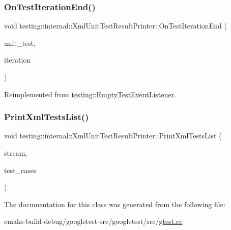 \mbox{\label{classtesting_1_1internal_1_1XmlUnitTestResultPrinter_a2ae986dd2f4f2aed31cc6f3bc8c56898}} 
\subsubsection{\texorpdfstring{OnTestIterationEnd()}{OnTestIterationEnd()}}
{\footnotesize\ttfamily void testing\+::internal\+::\+Xml\+Unit\+Test\+Result\+Printer\+::\+On\+Test\+Iteration\+End (\begin{DoxyParamCaption}\item[{const \mbox{\hyperlink{classtesting_1_1UnitTest}{Unit\+Test}} \&}]{unit\+\_\+test,  }\item[{int}]{iteration }\end{DoxyParamCaption})\hspace{0.3cm}{\ttfamily [virtual]}}



Reimplemented from \mbox{\hyperlink{classtesting_1_1EmptyTestEventListener_a2253e5a18b3cf7bccd349567a252209d}{testing\+::\+Empty\+Test\+Event\+Listener}}.

\mbox{\label{classtesting_1_1internal_1_1XmlUnitTestResultPrinter_aaefdb155fde088eea18310f23afd2daa}} 
\subsubsection{\texorpdfstring{PrintXmlTestsList()}{PrintXmlTestsList()}}
{\footnotesize\ttfamily void testing\+::internal\+::\+Xml\+Unit\+Test\+Result\+Printer\+::\+Print\+Xml\+Tests\+List (\begin{DoxyParamCaption}\item[{std\+::ostream $\ast$}]{stream,  }\item[{const std\+::vector$<$ \mbox{\hyperlink{classtesting_1_1TestCase}{Test\+Case}} $\ast$ $>$ \&}]{test\+\_\+cases }\end{DoxyParamCaption})\hspace{0.3cm}{\ttfamily [static]}}



The documentation for this class was generated from the following file\+:\begin{DoxyCompactItemize}
\item 
cmake-\/build-\/debug/googletest-\/src/googletest/src/\mbox{\hyperlink{gtest_8cc}{gtest.\+cc}}\end{DoxyCompactItemize}
